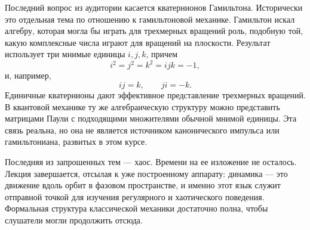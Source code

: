 Последний вопрос из аудитории касается кватернионов Гамильтона. Исторически это отдельная тема по отношению к гамильтоновой механике. Гамильтон искал алгебру, которая могла бы играть для трехмерных вращений роль, подобную той, какую комплексные числа играют для вращений на плоскости. Результат использует три мнимые единицы \(i,j,k\), причем
\begin{equation}
  i^2=j^2=k^2=ijk=-1,
\end{equation}
и, например,
\begin{equation}
  ij=k,
  \qquad
  ji=-k.
\end{equation}
Единичные кватернионы дают эффективное представление трехмерных вращений. В квантовой механике ту же алгебраическую структуру можно представить матрицами Паули с подходящими множителями обычной мнимой единицы. Эта связь реальна, но она не является источником канонического импульса или гамильтониана, развитых в этом курсе.

Последняя из запрошенных тем — хаос. Времени на ее изложение не осталось. Лекция завершается, отсылая к уже построенному аппарату: динамика — это движение вдоль орбит в фазовом пространстве, и именно этот язык служит отправной точкой для изучения регулярного и хаотического поведения. Формальная структура классической механики достаточно полна, чтобы слушатели могли продолжить отсюда.
